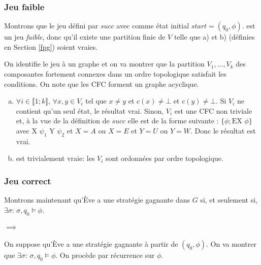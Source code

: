 \documentclass[10pt,a4paper]{article}
\begin{document}
\subsubsection{Jeu faible}
Montrons que le jeu défini par $succ$ avec comme état initial $start = (q_0, \phi)$.
 est un jeu \emph{faible}, donc qu'il existe une partition finie de $V$ telle que a) et b) (définies en Section \ref{fpg}) soient vraies.

On identifie le jeu à un graphe et on va montrer que la partition $V_1, \dots, V_k$ des composantes fortement connexes dans un ordre topologique satisfait les conditions. On note que les CFC forment un graphe acyclique.

\begin{enumerate}[a)]
\item $\forall i \in \llbracket 1 ; k \rrbracket$, $\forall x,y \in V_i$ tel que $x \neq y$ et $c(x) \neq \bot$ et $c(y) \neq \bot$. Si $V_i$ ne contient qu'un seul état, le résultat vrai. Sinon, $V_i$ est une CFC non triviale et, à la vue de la définition de $succ$ elle est de la forme suivante : $\{ \phi; \mbox{EX }\phi \}$ avec $\mbox{X } \psi_1 \mbox{ Y } \psi_2$ et $ X=A$ ou $X =E$ et $Y = U$ ou $Y=W$. Donc le résultat est vrai.

\item est trivialement vraie: les $V_i$ sont ordonnées par ordre topologique.
\end{enumerate}

\subsubsection{Jeu correct}
Montrons maintenant qu'Ève a une stratégie gagnante dans $G$ si, et seulement si, $\exists \sigma$: $\sigma,q_0 \vDash \phi$.

\paragraph{$\implies$}
On suppose qu'Ève a une stratégie gagnante à partir de $(q_0, \phi)$. On va montrer que $\exists \sigma$: $\sigma,q_0 \vDash \phi$. On procède par récurrence sur $\phi$.
\end{document}
